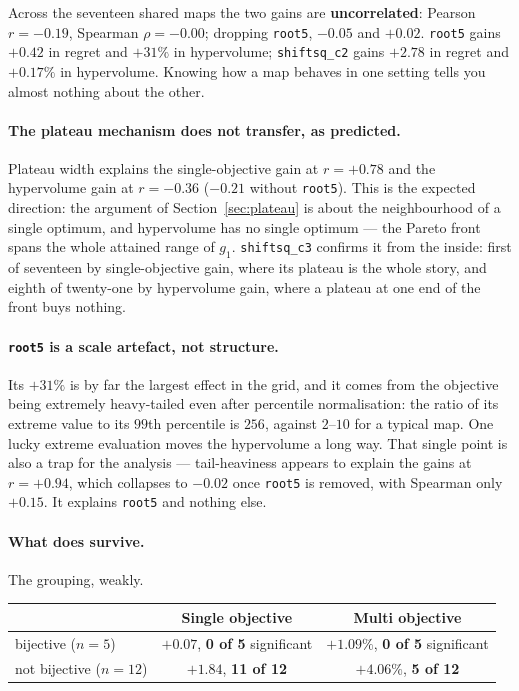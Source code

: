 \documentclass[11pt]{article}
\begin{document}
\noindent Across the seventeen shared maps the two gains are
\textbf{uncorrelated}: Pearson $r=-0.19$, Spearman $\rho=-0.00$; dropping
\texttt{root5}, $-0.05$ and $+0.02$. \texttt{root5} gains $+0.42$ in regret
and $+31\%$ in hypervolume; \texttt{shiftsq\_c2} gains $+2.78$ in regret and
$+0.17\%$ in hypervolume. Knowing how a map behaves in one setting tells you
almost nothing about the other.

\paragraph{The plateau mechanism does not transfer, as predicted.} Plateau
width explains the single-objective gain at $r=+0.78$ and the hypervolume gain
at $r=-0.36$ ($-0.21$ without \texttt{root5}). This is the expected direction:
the argument of Section~\ref{sec:plateau} is about the neighbourhood of a
single optimum, and hypervolume has no single optimum --- the Pareto front
spans the whole attained range of $g_1$. \texttt{shiftsq\_c3} confirms it from
the inside: first of seventeen by single-objective gain, where its plateau is
the whole story, and eighth of twenty-one by hypervolume gain, where a
plateau at one end of the front buys nothing.

\paragraph{\texttt{root5} is a scale artefact, not structure.} Its $+31\%$ is
by far the largest effect in the grid, and it comes from the objective being
extremely heavy-tailed even after percentile normalisation: the ratio of its
extreme value to its $99$th percentile is $256$, against $2$--$10$ for a
typical map. One lucky extreme evaluation moves the hypervolume a long way.
That single point is also a trap for the analysis --- tail-heaviness appears
to explain the gains at $r=+0.94$, which collapses to $-0.02$ once
\texttt{root5} is removed, with Spearman only $+0.15$. It explains
\texttt{root5} and nothing else.

\paragraph{What does survive.} The grouping, weakly.

\begin{center}
\small
\begin{tabular}{lcc}
\toprule
 & Single objective & Multi objective \\
\midrule
bijective ($n=5$) & $+0.07$, \textbf{0 of 5} significant & $+1.09\%$, \textbf{0 of 5} significant \\
not bijective ($n=12$) & $+1.84$, \textbf{11 of 12} & $+4.06\%$, \textbf{5 of 12} \\
\bottomrule
\end{tabular}
\end{center}
\end{document}
